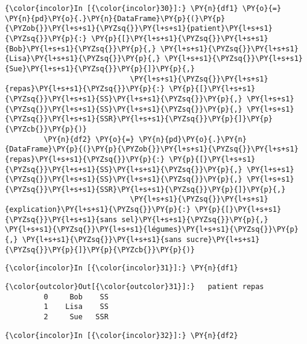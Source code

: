     \begin{Verbatim}[commandchars=\\\{\},frame=single,framerule=0.3mm,rulecolor=\color{cellframecolor}]
{\color{incolor}In [{\color{incolor}30}]:} \PY{n}{df1} \PY{o}{=} \PY{n}{pd}\PY{o}{.}\PY{n}{DataFrame}\PY{p}{(}\PY{p}{\PYZob{}}\PY{l+s+s1}{\PYZsq{}}\PY{l+s+s1}{patient}\PY{l+s+s1}{\PYZsq{}}\PY{p}{:} \PY{p}{[}\PY{l+s+s1}{\PYZsq{}}\PY{l+s+s1}{Bob}\PY{l+s+s1}{\PYZsq{}}\PY{p}{,} \PY{l+s+s1}{\PYZsq{}}\PY{l+s+s1}{Lisa}\PY{l+s+s1}{\PYZsq{}}\PY{p}{,} \PY{l+s+s1}{\PYZsq{}}\PY{l+s+s1}{Sue}\PY{l+s+s1}{\PYZsq{}}\PY{p}{]}\PY{p}{,}
                             \PY{l+s+s1}{\PYZsq{}}\PY{l+s+s1}{repas}\PY{l+s+s1}{\PYZsq{}}\PY{p}{:} \PY{p}{[}\PY{l+s+s1}{\PYZsq{}}\PY{l+s+s1}{SS}\PY{l+s+s1}{\PYZsq{}}\PY{p}{,} \PY{l+s+s1}{\PYZsq{}}\PY{l+s+s1}{SS}\PY{l+s+s1}{\PYZsq{}}\PY{p}{,} \PY{l+s+s1}{\PYZsq{}}\PY{l+s+s1}{SSR}\PY{l+s+s1}{\PYZsq{}}\PY{p}{]}\PY{p}{\PYZcb{}}\PY{p}{)}
         \PY{n}{df2} \PY{o}{=} \PY{n}{pd}\PY{o}{.}\PY{n}{DataFrame}\PY{p}{(}\PY{p}{\PYZob{}}\PY{l+s+s1}{\PYZsq{}}\PY{l+s+s1}{repas}\PY{l+s+s1}{\PYZsq{}}\PY{p}{:} \PY{p}{[}\PY{l+s+s1}{\PYZsq{}}\PY{l+s+s1}{SS}\PY{l+s+s1}{\PYZsq{}}\PY{p}{,} \PY{l+s+s1}{\PYZsq{}}\PY{l+s+s1}{SS}\PY{l+s+s1}{\PYZsq{}}\PY{p}{,} \PY{l+s+s1}{\PYZsq{}}\PY{l+s+s1}{SSR}\PY{l+s+s1}{\PYZsq{}}\PY{p}{]}\PY{p}{,}
                             \PY{l+s+s1}{\PYZsq{}}\PY{l+s+s1}{explication}\PY{l+s+s1}{\PYZsq{}}\PY{p}{:} \PY{p}{[}\PY{l+s+s1}{\PYZsq{}}\PY{l+s+s1}{sans sel}\PY{l+s+s1}{\PYZsq{}}\PY{p}{,} \PY{l+s+s1}{\PYZsq{}}\PY{l+s+s1}{légumes}\PY{l+s+s1}{\PYZsq{}}\PY{p}{,} \PY{l+s+s1}{\PYZsq{}}\PY{l+s+s1}{sans sucre}\PY{l+s+s1}{\PYZsq{}}\PY{p}{]}\PY{p}{\PYZcb{}}\PY{p}{)}
\end{Verbatim}


    \begin{Verbatim}[commandchars=\\\{\},frame=single,framerule=0.3mm,rulecolor=\color{cellframecolor}]
{\color{incolor}In [{\color{incolor}31}]:} \PY{n}{df1}
\end{Verbatim}


\begin{Verbatim}[commandchars=\\\{\},frame=single,framerule=0.3mm,rulecolor=\color{cellframecolor}]
{\color{outcolor}Out[{\color{outcolor}31}]:}   patient repas
         0     Bob    SS
         1    Lisa    SS
         2     Sue   SSR
\end{Verbatim}
            
    \begin{Verbatim}[commandchars=\\\{\},frame=single,framerule=0.3mm,rulecolor=\color{cellframecolor}]
{\color{incolor}In [{\color{incolor}32}]:} \PY{n}{df2}
\end{Verbatim}


